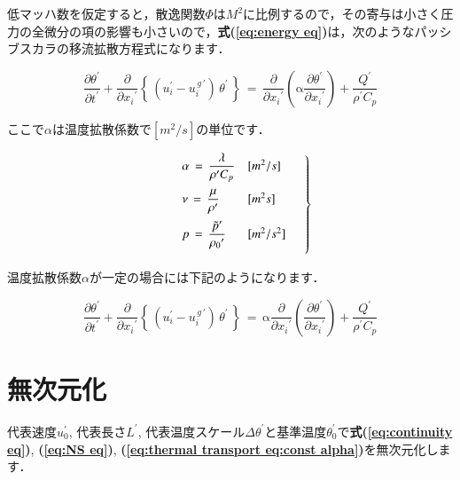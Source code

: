 \noindent 低マッハ数を仮定すると，散逸関数$\Phi$は$M^2$に比例するので，その寄与は小さく圧力の全微分の項の影響も小さいので，\textbf{式(\ref{eq:energy eq})}は，次のようなパッシブスカラの移流拡散方程式になります．

\begin{equation}
\frac{\partial \theta^{\prime}}{\partial{t}^{\prime}} + \frac{\partial}{\partial{{x}_{i}}^{\prime}} \left\{ \, \left( u_i^\prime - u_i^{\,g\,\prime} \right) \, \theta^\prime \, \right \}
\,{=}\, 
\frac{\partial}{\partial{{x}_{i}}^{\prime}} \left({ \mathrm{\alpha} \frac{\partial \theta^{\prime}}{\partial{{x}_{i}}^{\prime}} }\right) + \frac{Q^{\prime}}{\rho^{\prime}{C}_{p}}
\label{eq:thermal transport eq}
\end{equation}

\noindent ここで$\alpha$は温度拡散係数で$[m^2/s]$の単位です．

\begin{equation}
\qquad \left.
\begin{array}{ll}
\vspace{2mm}
\alpha\,=\, \displaystyle{ \frac{\lambda}{\rho^{\prime} C_{p}} } & [m^2/s]\\
\vspace{2mm}
\nu\,=\, \displaystyle{ \frac{\mu}{\rho^{\prime}} } & [m^2s]\\
\vspace{2mm}
p\,=\, \displaystyle{ \frac{{\tilde{p}}^{\prime}}{{\rho_{0}}^{\prime}} } & [m^2/s^2]
\end{array} \quad \right\}
\label{eq:thermal transport eq2}
\end{equation}

\noindent 温度拡散係数$\alpha$が一定の場合には下記のようになります．

\begin{equation}
\frac{\partial \theta^{\prime}}{\partial{t}^{\prime}} + \frac{\partial}{\partial{{x}_{i}}^{\prime}} \left\{ \, \left( u_i^\prime - u_i^{\,g\,\prime} \right) \, \theta^\prime \, \right \} 
\,{=}\,
\mathrm{\alpha} \frac{\partial}{\partial{{x}_{i}}^{\prime}} \left({ \frac{\partial \theta^{\prime}}{\partial{{x}_{i}}^{\prime}} }\right) + \frac{Q^{\prime}} {\rho^{\prime} {C}_{p}}
\label{eq:thermal transport eq:const alpha}
\end{equation}


%
\section{無次元化}
\label{sec:non dimensionalize}
代表速度$u_0^\prime$, 代表長さ$L^\prime$, 代表温度スケール$\Delta \theta^\prime$と基準温度$\theta_0^\prime$で\textbf{式(\ref{eq:continuity eq})}, \textbf{(\ref{eq:NS eq})}, \textbf{(\ref{eq:thermal transport eq:const alpha})}を無次元化します．

